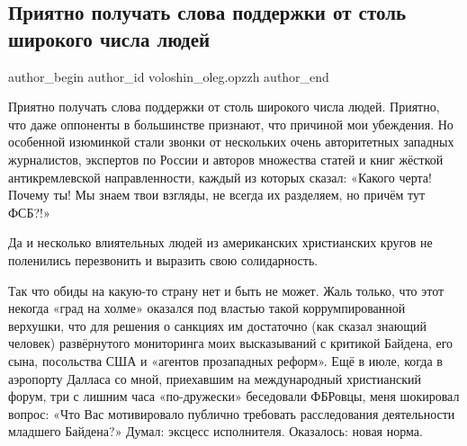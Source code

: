  
 
 
 
 
 
\subsection{Приятно получать слова поддержки от столь широкого числа людей}
\label{sec:20_01_2022.fb.voloshin_oleg.opzzh.1.sankcii}
 
\ifcmt
 author_begin
   author_id voloshin_oleg.opzzh
 author_end
\fi

Приятно получать слова поддержки от столь широкого числа людей. Приятно, что
даже оппоненты в большинстве признают, что причиной мои убеждения. Но особенной
изюминкой стали звонки от нескольких очень авторитетных западных журналистов,
экспертов по России и авторов множества статей и книг жёсткой антикремлевской
направленности, каждый из которых сказал: «Какого черта! Почему ты! Мы знаем
твои взгляды, не всегда их разделяем, но причём тут ФСБ?!»

Да и несколько влиятельных людей из американских христианских кругов не
поленились перезвонить и выразить свою солидарность. 

Так что обиды на какую-то страну нет и быть не может. Жаль только, что этот
некогда «град на холме» оказался под властью такой коррумпированной верхушки,
что для решения о санкциях им достаточно (как сказал знающий человек)
развёрнутого мониторинга моих высказываний с критикой Байдена, его сына,
посольства США и «агентов прозападных реформ». Ещё в июле, когда в аэропорту
Далласа со мной, приехавшим на международный христианский форум, три с лишним
часа «по-дружески» беседовали ФБРовцы, меня шокировал вопрос: «Что Вас
мотивировало публично требовать расследования деятельности младшего Байдена?»
Думал: эксцесс исполнителя. Оказалось: новая норма.

